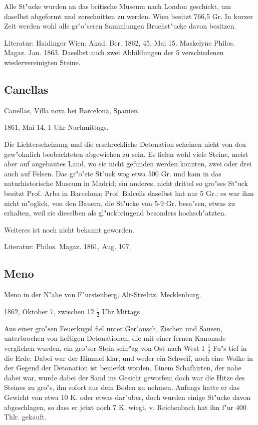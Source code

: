 \documentclass[a4paper, 11pt, oneside]{article}
\begin{document}
Alle St"ucke wurden an das britische Museum nach London geschickt, um daselbst abgeformt und zerschnitten zu werden. Wien besitzt 766,5 Gr. In kurzer Zeit werden wohl alle gr"o"seren Sammlungen Bruchst"ucke davon besitzen.

Literatur: Haidinger Wien. Akad. Ber. 1862, 45, Mai 15. Maskelyne Philos. Magaz. Jan. 1863. Daselbst auch zwei Abbildungen der 5 verschiedenen wiedervereinigten Steine.

\subsection{Canellas}

Canellas, Villa nova bei Barcelona, Spanien.

1861, Mai 14, 1 Uhr Nachmittags.

Die Lichterscheinung und die erschreckliche Detonation scheinen nicht von den gew"ohnlich beobachteten abgewichen zu sein. Es fielen wohl viele Steine, meist aber auf angebautes Land, wo sie nicht gefunden werden konnten, zwei oder drei auch auf Felsen. Das gr"o"ste St"uck wog etwa 500 Gr. und kam in das naturhistorische Museum in Madrid; ein anderes, nicht drittel so gro"ses St"uck besitzt Prof. Arba in Barcelona; Prof. Balcells daselbst hat nur 5 Gr.; es war ihm nicht m"oglich, von den Bauern, die St"ucke von 5-9 Gr. besa"sen, etwas zu erhalten, weil sie dieselben als gl"uckbringend besonders hochsch"atzten.

Weiteres ist noch nicht bekannt geworden.

Literatur: Philos. Magaz. 1861, Aug. 107.

\subsection{Meno}

Meno in der N"ahe von F"urstenberg, Alt-Strelitz, Mecklenburg.

1862, Oktober 7, zwischen 12 $\frac{1}{2}$ Uhr Mittags.

Aus einer gro"sen Feuerkugel fiel unter Ger"ausch, Zischen und Sausen, unterbrochen von heftigen Detonationen, die mit einer fernen Kanonade verglichen wurden, ein gro"ser Stein schr"ag von Ost nach West 1 $\frac{1}{2}$ Fu"s tief in die Erde. Dabei war der Himmel klar, und weder ein Schweif, noch eine Wolke in der Gegend der Detonation ist bemerkt worden. Einem Schafhirten, der nahe dabei war, wurde dabei der Sand ins Gesicht geworfen; doch war die Hitze des Steines zu gro"s, ihn sofort aus dem Boden zu nehmen. Anfangs hatte er das Gewicht von etwa 10 K. oder etwas dar"uber, doch wurden einige St"ucke davon abgeschlagen, so dass er jetzt noch 7 K. wiegt. v. Reichenbach hat ihn f"ur 400 Thlr. gekauft.
\end{document}
